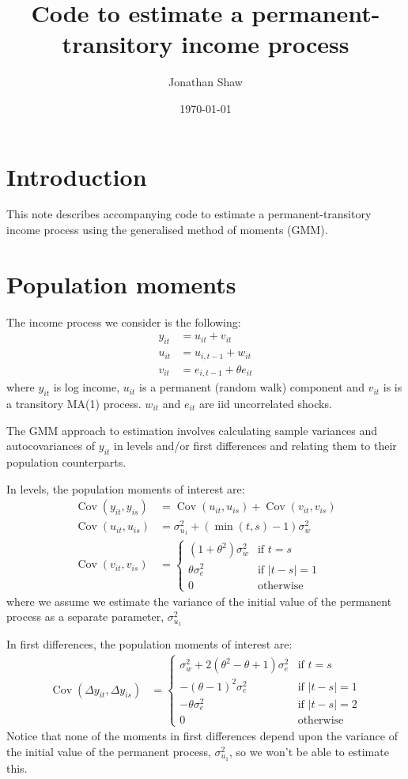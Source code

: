 \documentclass[12pt]{article}
\title{Code to estimate a permanent-transitory income process}
\author{Jonathan Shaw}
\date{\today}
\DeclareMathOperator{\Cov}{Cov}
\begin{document}
\maketitle

\section{Introduction}

This note describes accompanying code to estimate a permanent-transitory income process using the generalised method of moments (GMM).

\section{Population moments}

The income process we consider is the following:
%
\begin{align}
	y_{it} &= u_{it} + v_{it} \\
    u_{it} &= u_{i,t-1} + w_{it} \\
    v_{it} &= e_{i,t-1} + \theta e_{it}
\end{align}
%
where \(y_{it}\) is log income, \(u_{it}\) is a permanent (random walk) component and \(v_{it}\) is is a transitory MA(1) process. \(w_{it}\) and \(e_{it}\) are iid uncorrelated shocks.

The GMM approach to estimation involves calculating sample variances and autocovariances of \(y_{it}\) in levels and/or first differences and relating them to their population counterparts.

In levels, the population moments of interest are:
%
\begin{align}
	\Cov(y_{it}, y_{is}) &= \Cov(u_{it}, u_{is}) + \Cov(v_{it}, v_{is}) \\
	\Cov(u_{it}, u_{is}) &= \sigma_{u_{1}}^2 + (\min(t,s) - 1)\sigma_w^2 \\
	\Cov(v_{it}, v_{is}) &=\begin{cases}
		(1 + \theta^2)\sigma_w^2 & \text{if $t=s$} \\
		\theta\sigma_e^2 & \text{if $|t-s|=1$} \\
		0 & \text{otherwise}
	\end{cases}
\end{align}
%
where we assume we estimate the variance of the initial value of the permanent process as a separate parameter, \(\sigma_{u_{1}}^2\)

In first differences, the population moments of interest are:
%
\begin{align}
	\Cov(\Delta y_{it}, \Delta y_{is}) &=\begin{cases}
		\sigma_w^2 + 2(\theta^2 - \theta + 1)\sigma_e^2 & \text{if $t=s$} \\
		-(\theta - 1)^2\sigma_e^2 & \text{if $|t-s|=1$} \\
		-\theta\sigma_e^2 & \text{if $|t-s|=2$} \\ 	
		0 & \text{otherwise}
	\end{cases}
\end{align}
%
Notice that none of the moments in first differences depend upon the variance of the initial value of the permanent process, \(\sigma_{u_{1}}^2\), so we won't be able to estimate this.
\end{document}
